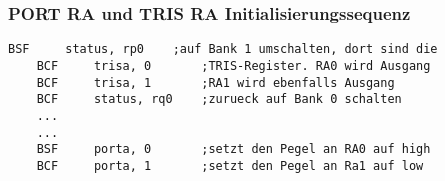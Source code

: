   \subsubsection*{PORT RA und TRIS RA Initialisierungssequenz}
  \begin{lstlisting}[language={[x86masm]Assembler}]
    BSF     status, rp0    ;auf Bank 1 umschalten, dort sind die 
    BCF     trisa, 0       ;TRIS-Register. RA0 wird Ausgang
    BCF     trisa, 1       ;RA1 wird ebenfalls Ausgang
    BCF     status, rq0    ;zurueck auf Bank 0 schalten 
    ... 
    ... 
    BSF     porta, 0       ;setzt den Pegel an RA0 auf high
    BCF     porta, 1       ;setzt den Pegel an Ra1 auf low

    \end{lstlisting}